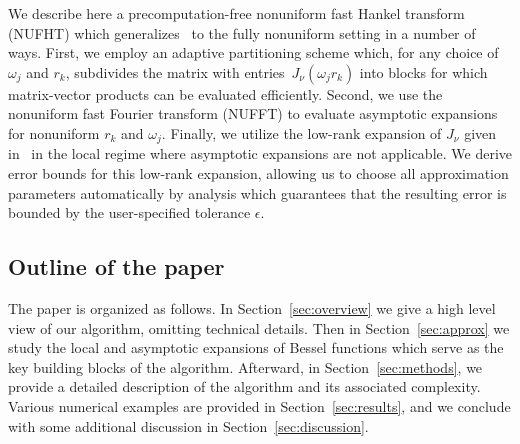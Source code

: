 We describe here a precomputation-free nonuniform fast Hankel transform (NUFHT)
which generalizes~\cite{townsend2015fast} to the fully nonuniform setting in a
number of ways. First, we employ an adaptive partitioning scheme which, for any
choice of $\omega_j$ and $r_k$, subdivides the matrix with
entries~$J_\nu(\omega_j r_k)$ into blocks for which matrix-vector products can
be evaluated efficiently. Second, we use the nonuniform fast Fourier transform
(NUFFT) to evaluate asymptotic expansions for nonuniform $r_k$ and $\omega_j$.
Finally, we utilize the low-rank expansion of $J_\nu$ given
in~\cite{wimp1962polynomial} in the local regime where asymptotic expansions are
not applicable. We derive error bounds for this low-rank expansion, allowing us
to choose all approximation parameters automatically by analysis which
guarantees that the resulting error is bounded by the user-specified tolerance
$\epsilon$.

\subsection*{Outline of the paper}

The paper is organized as follows. In Section~\ref{sec:overview} we give a high
level view of our algorithm, omitting technical details. Then in
Section~\ref{sec:approx} we study the local and asymptotic expansions of Bessel
functions which serve as the key building blocks of the algorithm. Afterward, in
Section~\ref{sec:methods}, we provide a detailed description of the algorithm
and its associated complexity. Various numerical examples are provided in
Section~\ref{sec:results}, and we conclude with some additional discussion in
Section~\ref{sec:discussion}.


